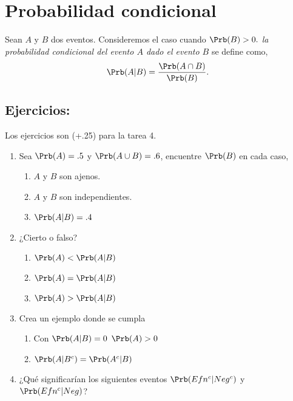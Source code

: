 \documentclass{assignment}
\begin{document}
\section{Probabilidad condicional}
Sean $A$ y $B$ dos eventos. Consideremos el caso cuando $\Prb(B)>0.$ \emph{la probabilidad condicional del evento $A$ dado el evento $B$} se define como,
\[
\Prb(A|B)=\frac{\Prb(A \cap B)}{\Prb(B)}.
\]


\subsection*{Ejercicios:}
Los ejercicios son (+.25) para la tarea 4.
\begin{enumerate}
	\item Sea $\Prb(A)=.5$ y $\Prb(A \cup B)=.6$, encuentre $\Prb(B)$ en cada caso,
	\begin{enumerate}
  	  \item $A$ y $B$ son ajenos.
  	  \item $A$ y $B$ son independientes. 
  	  \item $\Prb(A|B)=.4$
	\end{enumerate}

\item ¿Cierto o falso?
		\begin{enumerate}
		\item $\Prb(A) < \Prb(A|B)$
		\item $\Prb(A) = \Prb(A|B)$
		\item $\Prb(A) > \Prb(A|B)$
		\end{enumerate}
\item Crea un ejemplo donde se cumpla
		\begin{enumerate}
		\item Con $\Prb(A|B)=0$ $\Prb(A)>0$ 
		\item $\Prb(A|B^c) = \Prb(A^c|B)$
		\end{enumerate}
		
\item ¿Qué significarían los siguientes eventos $\Prb(Efn^c|Neg^c)$ y $\Prb(Efn^c|Neg)$?
\end{enumerate}
\end{document}
